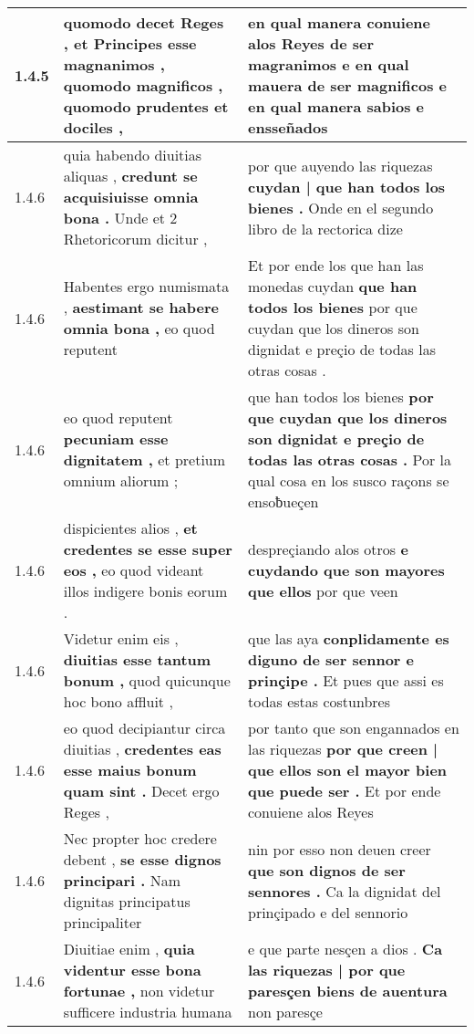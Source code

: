 \begin{tabular}{|p{1cm}|p{6.5cm}|p{6.5cm}|}
1.4.5 & quomodo decet Reges , \textbf{ et Principes esse magnanimos , quomodo magnificos , } quomodo prudentes et dociles , & en qual manera conuiene alos Reyes de ser magranimos \textbf{ e en qual mauera de ser magnificos } e en qual manera sabios e ensseñados \\\hline
1.4.6 & quia habendo diuitias aliquas , \textbf{ credunt se acquisiuisse omnia bona . } Unde et 2 Rhetoricorum dicitur , & por que auyendo las riquezas \textbf{ cuydan | que han todos los bienes . } Onde en el segundo libro de la rectorica dize \\\hline
1.4.6 & Habentes ergo numismata , \textbf{ aestimant se habere omnia bona , } eo quod reputent & Et por ende los que han las monedas cuydan \textbf{ que han todos los bienes } por que cuydan que los dineros son dignidat e preçio de todas las otras cosas . \\\hline
1.4.6 & eo quod reputent \textbf{ pecuniam esse dignitatem , } et pretium omnium aliorum ; & que han todos los bienes \textbf{ por que cuydan que los dineros son dignidat e preçio de todas las otras cosas . } Por la qual cosa en los susco raçons se ensoƀueçen \\\hline
1.4.6 & dispicientes alios , \textbf{ et credentes se esse super eos , } eo quod videant illos indigere bonis eorum . & despreçiando alos otros \textbf{ e cuydando que son mayores que ellos } por que veen \\\hline
1.4.6 & Videtur enim eis , \textbf{ diuitias esse tantum bonum , } quod quicunque hoc bono affluit , & que las aya \textbf{ conplidamente es diguno de ser sennor e prinçipe . } Et pues que assi es todas estas costunbres \\\hline
1.4.6 & eo quod decipiantur circa diuitias , \textbf{ credentes eas esse maius bonum quam sint . } Decet ergo Reges , & por tanto que son engannados en las riquezas \textbf{ por que creen | que ellos son el mayor bien que puede ser . } Et por ende conuiene alos Reyes \\\hline
1.4.6 & Nec propter hoc credere debent , \textbf{ se esse dignos principari . } Nam dignitas principatus principaliter & nin por esso non deuen creer \textbf{ que son dignos de ser sennores . } Ca la dignidat del prinçipado e del sennorio \\\hline
1.4.6 & Diuitiae enim , \textbf{ quia videntur esse bona fortunae , } non videtur sufficere industria humana & e que parte nesçen a dios . \textbf{ Ca las riquezas | por que paresçen biens de auentura } non paresçe \\\hline

\end{tabular}
